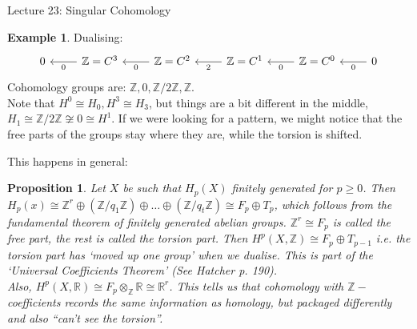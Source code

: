 \documentclass[10pt]{article}
\theoremstyle{plain}
\newtheorem{prop}[thm]{Proposition}
\theoremstyle{definition}
\newtheorem{exmp}[thm]{Example} %
\newcommand{\Real}{\mathbb{R}}
\newcommand{\Zint}{\mathbb{Z}}
\begin{document}
\begin{section}{Lecture 23: Singular Cohomology}
\begin{exmp}
    Dualising: $$    \begin{tikzcd}
    0  & \arrow[l, "0"] \mathbb{Z} = C^3  & \arrow[l, "0"] \mathbb{Z} = C^2  &\arrow[l, " 2"] \mathbb{Z} = C^1 & \arrow[l, "0"] \mathbb{Z} = C^0  &\arrow[l, "0"] 0
    \end{tikzcd}$$
    Cohomology groups are: $\Zint, 0, \Zint/2\Zint, \Zint. $\\
    Note that $H^0 \cong H_0, H^3 \cong H_3$, but things are a bit different in the middle, $H_1 \cong \Zint / 2 \Zint \not \cong 0 \cong H^1 $. If we were looking for a pattern, we might notice that the free parts of the groups stay where they are, while the torsion is shifted.
\end{exmp}
This happens in general:

\begin{prop}
    Let $X$ be such that $H_p(X)$ finitely generated for $p \geq 0$. Then $H_p(x) \cong \Zint^r \oplus (\Zint / q_1 \Zint) \oplus \ldots \oplus (\Zint / q_t \Zint) \cong F_p \oplus T_p$, which follows from the fundamental theorem of finitely generated abelian groups. $\Zint^r \cong F_p$ is called the free part, the rest is called the torsion part. Then $H^p(X,\Zint) \cong F_p \oplus T_{p-1}$ i.e. the torsion part has `moved up one group' when we dualise. This is part of the `Universal Coefficients Theorem' (See Hatcher p. 190). \\
    Also, $H^p(X, \Real) \cong F_p \otimes_{\Zint} \Real \cong \Real^r$. This tells us that cohomology with $\Zint-$coefficients records the same information as homology, but packaged differently and also ``can't see the torsion''.
\end{prop}


\end{section}
\end{document}
